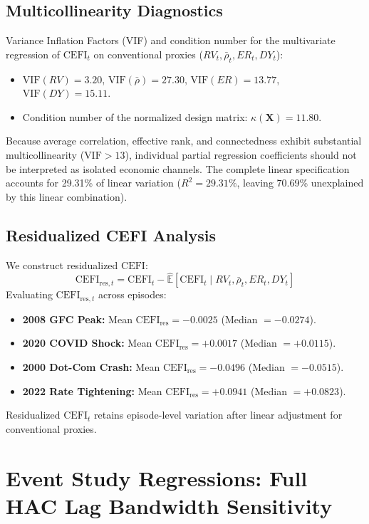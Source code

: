 \documentclass[12pt]{article}
\begin{document}
\subsection{Multicollinearity Diagnostics}
Variance Inflation Factors (VIF) and condition number for the multivariate regression of $\mathrm{CEFI}_t$ on conventional proxies ($RV_t, \bar{\rho}_t, ER_t, DY_t$):
\begin{itemize}
    \item $\text{VIF}(RV) = 3.20$, $\text{VIF}(\bar{\rho}) = 27.30$, $\text{VIF}(ER) = 13.77$, $\text{VIF}(DY) = 15.11$.
    \item Condition number of the normalized design matrix: $\kappa(\mathbf{X}) = 11.80$.
\end{itemize}
Because average correlation, effective rank, and connectedness exhibit substantial multicollinearity ($\text{VIF} > 13$), individual partial regression coefficients should not be interpreted as isolated economic channels. The complete linear specification accounts for 29.31\% of linear variation ($R^2 = 29.31\%$, leaving 70.69\% unexplained by this linear combination).

\subsection{Residualized CEFI Analysis}
We construct residualized $\mathrm{CEFI}$:
\begin{equation}
\mathrm{CEFI}_{\text{res},t} = \mathrm{CEFI}_t - \hat{\mathbb{E}}[\mathrm{CEFI}_t \mid RV_t, \bar{\rho}_t, ER_t, DY_t]
\end{equation}
Evaluating $\mathrm{CEFI}_{\text{res},t}$ across episodes:
\begin{itemize}
    \item \textbf{2008 GFC Peak:} Mean $\mathrm{CEFI}_{\text{res}} = -0.0025$ (Median $= -0.0274$).
    \item \textbf{2020 COVID Shock:} Mean $\mathrm{CEFI}_{\text{res}} = +0.0017$ (Median $= +0.0115$).
    \item \textbf{2000 Dot-Com Crash:} Mean $\mathrm{CEFI}_{\text{res}} = -0.0496$ (Median $= -0.0515$).
    \item \textbf{2022 Rate Tightening:} Mean $\mathrm{CEFI}_{\text{res}} = +0.0941$ (Median $= +0.0823$).
\end{itemize}
Residualized $\mathrm{CEFI}_t$ retains episode-level variation after linear adjustment for conventional proxies.

\section{Event Study Regressions: Full HAC Lag Bandwidth Sensitivity}
\label{app:hac_bandwidth}
\end{document}
